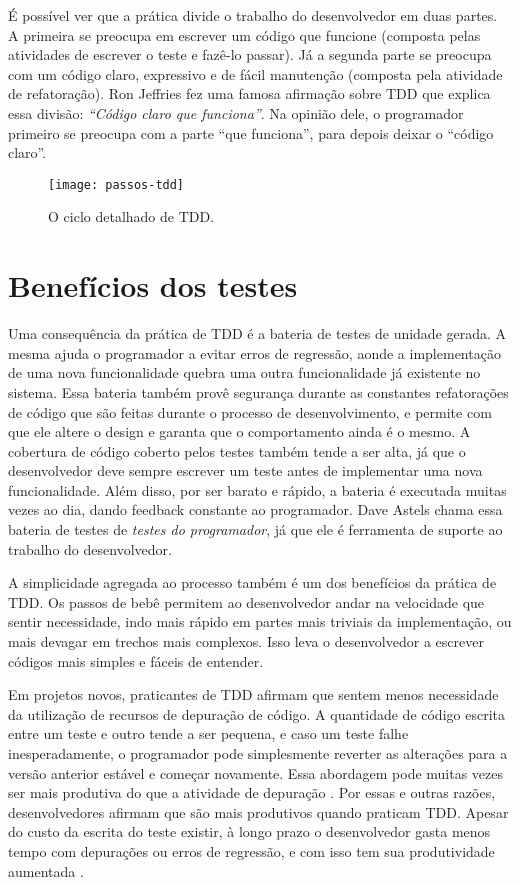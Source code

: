 É possível ver que a prática divide o trabalho do desenvolvedor em duas partes.
A primeira se preocupa em escrever um código que funcione (composta pelas
atividades de escrever o teste e fazê-lo passar). Já a segunda parte se preocupa
com um código claro, expressivo e de fácil manutenção (composta pela atividade
de refatoração). Ron Jeffries fez uma famosa afirmação sobre TDD que explica
essa divisão: \textit{``Código claro que funciona''}. Na opinião dele, o programador 
primeiro se preocupa com a parte ``que funciona'', para depois deixar o ``código claro''.

\begin{figure}
  \centering
  \texttt{[image: passos-tdd]}
  \caption{O ciclo detalhado de TDD.}
  \label{fig:passos-tdd}
\end{figure}

\section{Benefícios dos testes}

Uma consequência da prática de TDD é a bateria de testes de unidade gerada.
A mesma ajuda o programador a evitar erros de regressão, aonde a implementação de
uma nova funcionalidade quebra uma outra funcionalidade já existente no sistema.
Essa bateria também provê segurança durante as
constantes refatorações de código que são feitas durante o processo de
desenvolvimento, e permite com que ele altere o design e garanta que o
comportamento ainda é o mesmo. 
A cobertura de código coberto pelos testes também tende a ser alta, já que o
desenvolvedor deve sempre escrever um teste antes de implementar uma nova
funcionalidade. Além disso, por ser barato e rápido, a bateria é executada
muitas vezes ao dia, dando feedback constante ao programador.
Dave Astels \cite{astels-tdd} chama essa bateria
de testes de \textit{testes do programador}, já que ele é ferramenta de 
suporte ao trabalho do desenvolvedor.

A simplicidade agregada ao processo também é um dos benefícios da prática de
TDD. Os passos de bebê permitem ao desenvolvedor andar na velocidade que
sentir necessidade, indo mais rápido em partes mais triviais da implementação,
ou mais devagar em trechos mais complexos. Isso leva o desenvolvedor a escrever
códigos mais simples e fáceis de entender.

Em projetos novos, praticantes de TDD afirmam que sentem menos necessidade da
utilização de recursos de depuração de código. A quantidade de código
escrita entre um teste e outro tende a ser pequena, e caso um teste falhe
inesperadamente, o programador pode simplesmente reverter as alterações para a 
versão anterior estável e começar novamente. Essa abordagem pode muitas vezes
ser mais produtiva do que a atividade de depuração 
\cite{janzen-arch-improvement}. Por essas e outras razões, desenvolvedores afirmam 
que são mais produtivos quando praticam TDD. Apesar do custo da escrita do teste
existir, à longo prazo o desenvolvedor gasta menos tempo com depurações ou 
erros de regressão, e com isso tem sua produtividade aumentada
\cite{george-e-williams}.

